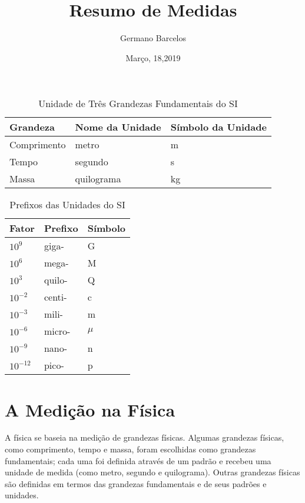\documentclass[12pt,a4paper]{article}
\title{Resumo de Medidas}
\date{Março, 18,2019}
\author{Germano Barcelos}
\begin{document}
    \maketitle
    \begin{table}[h]
        \centering
        \caption{Unidade de Três Grandezas Fundamentais do SI}
        \vspace{0.5cm}
        \begin{tabular}{lll}
            \hline
            Grandeza & Nome da Unidade & Símbolo da Unidade \\
            \hline
            Comprimento & metro & m \\
            Tempo & segundo & s\\
            Massa & quilograma & kg \\
            \hline
        \end{tabular}
    \end{table}

    \begin{table}[h]
        \centering
        \caption{Prefixos das Unidades do SI}
        \vspace{0.5cm}
        \begin{tabular}{lll}
            \hline
            Fator & Prefixo & Símbolo \\
            \hline
            $10^9$ & giga- & G \\
            $10^6$ & mega- & M \\
            $10^3$ & quilo- & Q \\
            $10^{-2}$ & centi- & c \\
            $10^{-3}$ & mili- & m \\
            $10^{-6}$ & micro- & $\mu$ \\
            $10^{-9}$ & nano- & n \\
            $10^{-12}$ & pico- & p
        \end{tabular}
    \end{table}  
    
    \section*{A Medição na Física}
    A física se baseia na medição de grandezas físicas. Algumas grandezas físicas, como comprimento, tempo e massa, foram escolhidas como grandezas fundamentais; cada uma foi definida através de um padrão e recebeu uma unidade de medida (como metro, segundo e quilograma). Outras grandezas físicas são definidas em termos das grandezas fundamentais e de seus padrões e unidades.
\end{document}
